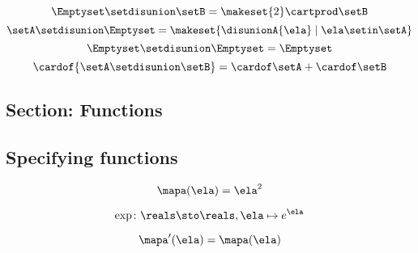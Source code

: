{\begin{forslides}
\begin{equation}
        \Emptyset \setdisunion \setB =  \makeset{2} \cartprod \setB
    \end{equation}
    \begin{equation}
        \label{eq:slides_session2_73}
        \setA \setdisunion \Emptyset =  \makeset{ \disunionA{\ela} \mid \ela \setin\setA }
    \end{equation}
    \begin{equation}
        \label{eq:slides_session2_74}
        \Emptyset \setdisunion \Emptyset = \Emptyset
    \end{equation}
    \begin{equation}
        \label{eq:slides_session2_75}
        \cardof{ \setA \setdisunion \setB}  = \cardof \setA  + \cardof \setB
    \end{equation}

    \subsection{Section: Functions}

    \subsection{Specifying functions}

    \begin{equation}
        \label{eq:slides_session2_76}
        \mapa(\ela)=\ela^2
    \end{equation}

    \begin{equation}
        \label{eq:slides_session2_77}
        \exp \colon \reals \sto \reals, \ela \mapsto e^{\ela}
    \end{equation}

    \begin{equation}
        \label{eq:slides_session2_78}
        \mapa'(\ela) = \mapa(\ela)
    \end{equation}


\end{forslides}}

